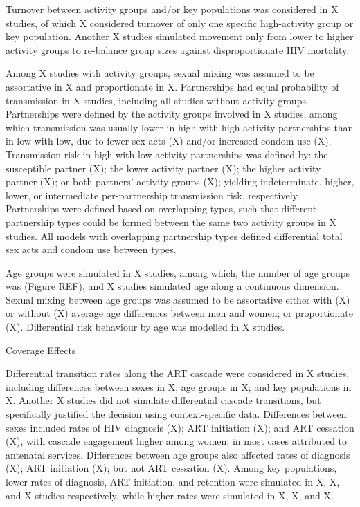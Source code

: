 Turnover between activity groups and/or key populations
was considered in X studies,
of which X considered turnover of only
one specific high-activity group or key population.
Another X studies simulated
movement only from lower to higher activity groups
to re-balance group sizes against disproportionate HIV mortality.

Among X studies with activity groups, sexual mixing was assumed to be
assortative in X and proportionate in X.
Partnerships had equal probability of transmission in X studies,
including all studies without activity groups.
Partnerships were defined by the activity groups involved in X studies,
among which transmission was usually
lower in high-with-high activity partnerships than in low-with-low, due to
fewer sex acts (X) and/or increased condom use (X).
Transmission risk in high-with-low activity partnerships was defined by:
the susceptible partner (X);
the lower activity partner (X);
the higher activity partner (X); or
both partners' activity groups (X);
yielding indeterminate, higher, lower, or intermediate
per-partnership transmission risk, respectively.
Partnerships were defined based on overlapping types, such that
different partnership types could be formed between the same two activity groups in X studies.
All models with overlapping partnership types defined differential total sex acts and condom use between types.

Age groups were simulated in X studies, among which,
the number of age groups was  (Figure REF),
and X studies simulated age along a continuous dimension.
Sexual mixing between age groups was assumed to be assortative
either with (X) or without (X)
average age differences between men and women;
or proportionate (X).
Differential risk behaviour by age was modelled in X studies.

Coverage Effects

Differential transition rates along the ART cascade were considered in
X studies, including differences between
sexes in X;
age groups in X; and
key populations in X.
Another X studies did not simulate differential cascade transitions,
but specifically justified the decision using context-specific data.
Differences between sexes included rates of
HIV diagnosis (X);
ART initiation (X); and
ART cessation (X),
with cascade engagement higher among women,
in most cases attributed to antenatal services.
Differences between age groups also affected
rates of diagnosis (X);
ART initiation (X);
but not ART cessation (X). 
Among key populations, lower rates of
diagnosis, ART initiation, and retention were simulated in
X, X, and X
studies respectively, while higher rates were simulated in
X, X, and X.

